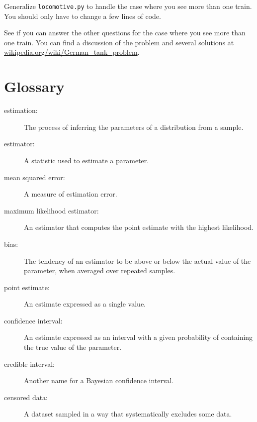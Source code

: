 \documentclass[12pt]{book}
\begin{document}
\begin{ex}

Generalize \verb"locomotive.py" to handle the case where you
see more than one train.  You should only have to
change a few lines of code.

See if you can answer the other questions for the case where you
see more than one train.  You can find a discussion of the problem
and several solutions at
\url{wikipedia.org/wiki/German_tank_problem}.

\end{ex}

\section{Glossary}

\begin{description}

\item[estimation:] The process of inferring the parameters of a distribution
from a sample.

\item[estimator:] A statistic used to estimate a parameter.

\item[mean squared error:] A measure of estimation error.

\item[maximum likelihood estimator:] An estimator that computes the
point estimate with the highest likelihood.

\item[bias:] The tendency of an estimator to be above or below the actual
value of the parameter, when averaged over repeated samples.

\item[point estimate:] An estimate expressed as a single value.

\item[confidence interval:] An estimate expressed as an interval with a
given probability of containing the true value of the parameter.

\item[credible interval:] Another name for a Bayesian confidence interval.

\item[censored data:] A dataset sampled in a way that systematically
excludes some data.

\end{description}
\end{document}
